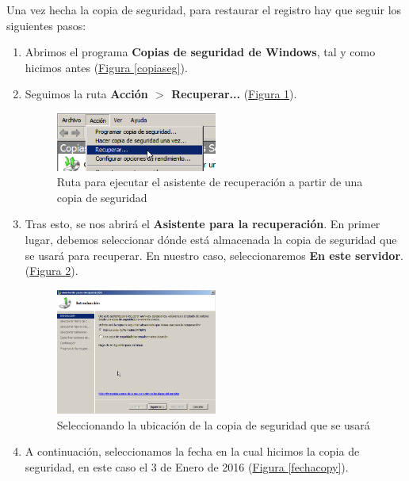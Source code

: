 \documentclass[10pt,a4paper,spanish]{article}
\numberwithin{equation}{section} %
\numberwithin{figure}{section} %
\numberwithin{table}{section} %
\begin{document}
Una vez hecha la copia de seguridad, para restaurar el registro hay que seguir los siguientes pasos:
\begin{enumerate}[1.]
\item Abrimos el programa \textbf{Copias de seguridad de Windows}, tal y como hicimos antes (\hyperref[copiaseg]{Figura \ref*{copiaseg}}).
\item Seguimos la ruta \textbf{Acción $>$ Recuperar...} (\hyperref[recuperar]{Figura \ref*{recuperar}}).
    \begin{figure}[!h]
        \centering
        \includegraphics[width=0.5\textwidth]{11}
        \caption{Ruta para ejecutar el asistente de recuperación a partir de una copia de seguridad}
        \label{recuperar}
    \end{figure}

\item Tras esto, se nos abrirá el \textbf{Asistente para la recuperación}. En primer lugar, debemos seleccionar dónde está almacenada la copia de seguridad que se usará para recuperar. En nuestro caso, seleccionaremos \textbf{En este servidor}. (\hyperref[ubicopy]{Figura \ref*{ubicopy}}).

    \begin{figure}[!h]
        \centering
        \includegraphics[width=0.5\textwidth]{12}
        \caption{Seleccionando la ubicación de la copia de seguridad que se usará}
        \label{ubicopy}
    \end{figure}

\item A continuación, seleccionamos la fecha en la cual hicimos la copia de seguridad, en este caso el 3 de Enero de 2016 (\hyperref[fechacopy]{Figura \ref*{fechacopy}}).


\end{enumerate}
\end{document}
